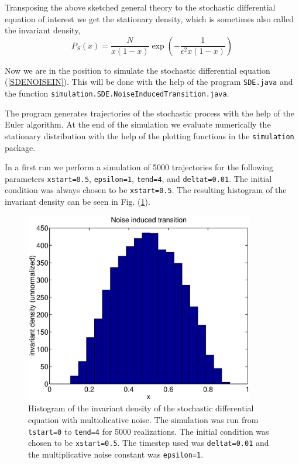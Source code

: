 Transposing the above sketched general theory to the stochastic 
differential equation of interest  we get the stationary density,
which is sometimes also called the invariant density,
\begin{equation*}
P_S(x) = \frac{N}{x(1-x)} \exp\left( - \frac{1}
           {\epsilon^2 x(1-x)}\right)
\end{equation*}

Now we are in the position to simulate the stochastic differential
equation (\ref{SDENOISEIN}). This will be done with the help of 
the program \verb|SDE.java| and the function 
\verb|simulation.SDE.NoiseInducedTransition.java|.



The program generates trajectories of the stochastic process with 
the help of the Euler algorithm. At the end of the simulation we evaluate 
numerically the stationary distribution with the help
of the plotting functions  in the \verb|simulation| package.

In a first run we perform a simulation of 5000 trajectories for 
the following parameters \texttt{xstart=0.5}, \texttt{epsilon=1},
\texttt{tend=4}, and \texttt{deltat=0.01}. The initial condition
was always chosen to be \texttt{xstart=0.5}. The resulting histogram
of the invariant density can be seen in Fig. 
(\ref{F_SDENOISEIN_1}).

\begin{figure}
\label{F_SDENOISEIN_1}
\includegraphics[width=10cm]{../Figures/f_sdenoisein_1.eps}
\caption{Histogram of the invariant density of the stochastic differential 
equation with multiolicative noise. The simulation was run from
\texttt{tstart=0} to \texttt{tend=4} for 5000 realizations.
The initial condition was chosen to be \texttt{xstart=0.5}.
The timestep used was \texttt{deltat=0.01} and the multiplicative noise 
constant was \texttt{epsilon=1}.} 
\end{figure}

